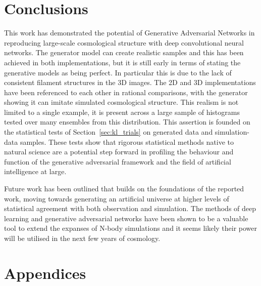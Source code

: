 \documentclass[twocolumn]{article}
\numberwithin{equation}{section}
\begin{document}
\section{Conclusions}\label{sec:conclusions}
This work has demonstrated the potential of Generative Adversarial Networks in reproducing large-scale cosmological 
structure with deep convolutional neural networks. The generator model can create realistic samples and this has been 
achieved in both implementations, but it is still early in terms of stating the generative models as being perfect. In 
particular this is due to the lack of consistent filament structures in the 3D images. The 2D and 3D implementations have 
been referenced to each other in rational comparisons, with the generator showing it can imitate simulated cosmological 
structure. %
This realism is not limited to a single example, it is present across a large sample of histograms tested over many 
ensembles from this distribution. This assertion is founded on the statistical tests of Section~\ref{sec:kl_trials} on 
generated data and simulation-data samples. These tests show that rigorous statistical methods native to natural science 
are a potential step forward in profiling the behaviour and function of the generative adversarial framework and the field
of artificial intelligence at large. 

Future work has been outlined that builds on the foundations of the reported work, moving towards generating an artificial 
universe at higher levels of statistical agreement with both observation and simulation. The methods of deep learning and
generative adversarial networks have been shown to be a valuable tool to extend the expanses of N-body simulations and it 
seems likely their power will be utilised in the next few years of cosmology. 

{\footnotesize  %
}


\setcounter{section}{0}
\section*{Appendices}
\end{document}
